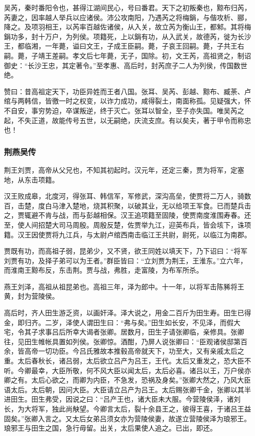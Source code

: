 \documentclass[]{article}
\begin{document}
吴芮，秦时番阳令也，甚得江湖间民心，号曰番君。天下之初叛秦也，黥布归芮，芮妻之，因率越人举兵以应诸侯。沛公攻南阳，乃遇芮之将梅鋗，与偕攻析、郦，降之。及项羽相王，以芮率百越佐诸侯，从入关，故立芮为衡山王，都邾。其将梅鋗功多，封十万户，为列侯。项籍死，上以鋗有功，从入武关，故德芮，徙为长沙王，都临湘，一年薨，谥曰文王，子成王臣嗣。薨，子哀王回嗣。薨，子共王右嗣。薨，子靖王差嗣。孝文后七年薨，无子，国除。初，文王芮，高祖贤之，制诏御史：``长沙王忠，其定著令。''至孝惠、高后时，封芮庶子二人为列侯，传国数世绝。

赞曰：昔高祖定天下，功臣异姓而王者八国。张耳、吴芮、彭越、黥布、臧荼、卢绾与两韩信，皆徼一时之权变，以诈力成功，咸得裂土，南面称孤。见疑强大，怀不自安，事穷势迫，卒谋叛逆，终于灭亡。张耳以智全，至子亦失国。唯吴芮之起，不失正道，故能传号五世，以无嗣绝，庆流支庶。有以矣夫，著于甲令而称忠也！

\hypertarget{header-n3573}{%
\subsubsection{荆燕吴传}\label{header-n3573}}

荆王刘贾，高帝从父兄也，不知其初起时。汉元年，还定三秦，贾为将军，定塞地，从东击项籍。

汉王败成皋，北度河，得张耳、韩信军，军修武，深沟高垒，使贾将二万人，骑数百，击楚，度白马津入楚地，烧其积聚，以破其业，无以给项王军食。已而楚兵击之，贾辄避不肯与战，而与彭越相保。汉王追项籍至固陵，使贾南度淮围寿春。还至，使人间招楚大司马周殷。周殷反楚，佐贾举九江，迎英布兵，皆会垓下，诛项籍。汉王因使贾将九江兵，与太尉卢绾西南击临江王共尉，尉死，以临江为南郡。

贾既有功，而高祖子弱，昆弟少，又不贤，欲王同姓以填天下，乃下诏曰：``将军刘贾有功，及择子弟可以为王者。''群臣皆曰：``立刘贾为荆王，王淮东。''立六年，而淮南王黥布反，东击荆。贾与战，弗胜，走富陵，为布军所杀。

燕王刘泽，高祖从祖昆弟也。高祖三年，泽为郎中。十一年，以将军击陈豨将王黄，封为营陵侯。

高后时，齐人田生游乏资，以画奸泽。泽大说之，用金二百斤为田生寿。田生已得金，即归齐。二岁，泽使人谓田生曰：``弗与矣。''田生如长安，不见泽，而假大宅，令其子求事吕后所幸大谒者张卿。居数月，田生子请张卿临，亲修具。张卿往，见田生帷帐具置如列侯。张卿惊。酒酣，乃屏人说张卿曰：``臣观诸侯邸第百余，皆高帝一切功臣。今吕氏雅故本推毂高帝就天下，功至大，又有亲戚太后之重。太后春秋长，诸吕弱，太后欲立吕产为吕王，王代。太后又重发之，恐大臣不听。今卿最幸，大臣所敬，何不风大臣以闻太后，太后必喜。诸吕以王，万户侯亦卿之有。太后心欲之，而卿为内臣，不急发，恐祸及身矣。''张卿大然之，乃风大臣语太后。太后朝，因问大臣。大臣请立吕产为吕王。太后赐张卿千金，张卿以其半进田生。田生弗受，因说之曰：``吕产王也，诸大臣未大服。今营陵侯泽，诸刘长，为大将军，独此尚觖望。今卿言太后，裂十余县王之，彼得王喜，于诸吕王益固矣。''张卿入言之。又太后女弟吕须女亦为营陵侯妻，故遂立营陵侯泽为琅邪王。琅邪王与田生之国，急行毋留。出关，太后果使人追之。已出，即还。
\end{document}
